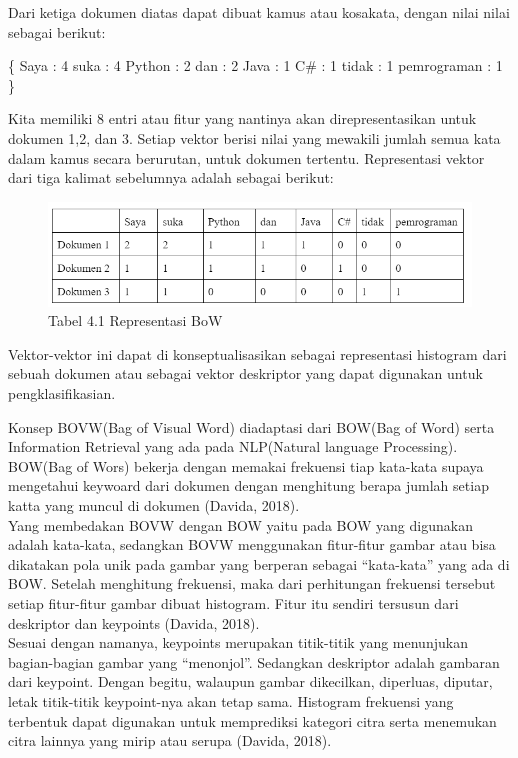 \documentclass[
  letterpaper,
  DIV=11,
  numbers=noendperiod]{scrreprt}
\newenvironment{Shaded}{\begin{snugshade}}{\end{snugshade}}
\newcommand{\NormalTok}[1]{\textcolor[rgb]{0.00,0.23,0.31}{#1}}
\begin{document}
Dari ketiga dokumen diatas dapat dibuat kamus atau kosakata, dengan
nilai nilai sebagai berikut:

\begin{Shaded}
\begin{Highlighting}[]
\NormalTok{\{  }
\NormalTok{    Saya : 4   }
\NormalTok{    suka : 4  }
\NormalTok{    Python : 2  }
\NormalTok{    dan : 2  }
\NormalTok{    Java : 1  }
\NormalTok{    C\# : 1  }
\NormalTok{    tidak : 1  }
\NormalTok{    pemrograman : 1  }
\NormalTok{\} }
\end{Highlighting}
\end{Shaded}

Kita memiliki 8 entri atau fitur yang nantinya akan direpresentasikan
untuk dokumen 1,2, dan 3. Setiap vektor berisi nilai yang mewakili
jumlah semua kata dalam kamus secara berurutan, untuk dokumen tertentu.
Representasi vektor dari tiga kalimat sebelumnya adalah sebagai berikut:

\begin{figure}

{\centering \includegraphics{Asset/image117.png}

}

\caption{Tabel 4.1 Representasi BoW}

\end{figure}

Vektor-vektor ini dapat di konseptualisasikan sebagai representasi
histogram dari sebuah dokumen atau sebagai vektor deskriptor yang dapat
digunakan untuk pengklasifikasian.

Konsep BOVW(Bag of Visual Word) diadaptasi dari BOW(Bag of Word) serta
Information Retrieval yang ada pada NLP(Natural language Processing).
BOW(Bag of Wors) bekerja dengan memakai frekuensi tiap kata-kata supaya
mengetahui keywoard dari dokumen dengan menghitung berapa jumlah setiap
katta yang muncul di dokumen (Davida, 2018).\\
Yang membedakan BOVW dengan BOW yaitu pada BOW yang digunakan adalah
kata-kata, sedangkan BOVW menggunakan fitur-fitur gambar atau bisa
dikatakan pola unik pada gambar yang berperan sebagai ``kata-kata'' yang
ada di BOW. Setelah menghitung frekuensi, maka dari perhitungan
frekuensi tersebut setiap fitur-fitur gambar dibuat histogram. Fitur itu
sendiri tersusun dari deskriptor dan keypoints (Davida, 2018).\\
Sesuai dengan namanya, keypoints merupakan titik-titik yang menunjukan
bagian-bagian gambar yang ``menonjol''. Sedangkan deskriptor adalah
gambaran dari keypoint. Dengan begitu, walaupun gambar dikecilkan,
diperluas, diputar, letak titik-titik keypoint-nya akan tetap sama.
Histogram frekuensi yang terbentuk dapat digunakan untuk memprediksi
kategori citra serta menemukan citra lainnya yang mirip atau serupa
(Davida, 2018).
\end{document}
